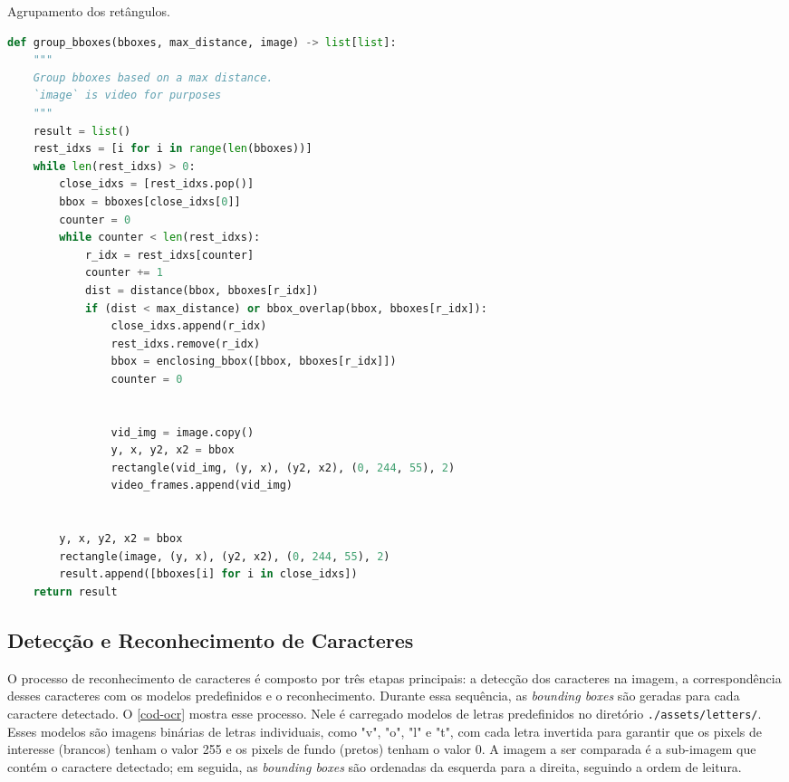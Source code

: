 \documentclass[english, 
               brazil, 
               bsc] %
               {dcomp-abntex2}
\begin{document}
\begin{codigo}[h]
  \caption{\small Agrupamento dos retângulos.}
 \label{cod-group_bboxes}
\begin{lstlisting}[language=python]
def group_bboxes(bboxes, max_distance, image) -> list[list]:
    """
    Group bboxes based on a max distance.
    `image` is video for purposes
    """
    result = list()
    rest_idxs = [i for i in range(len(bboxes))]
    while len(rest_idxs) > 0:
        close_idxs = [rest_idxs.pop()]
        bbox = bboxes[close_idxs[0]]
        counter = 0
        while counter < len(rest_idxs):
            r_idx = rest_idxs[counter]
            counter += 1
            dist = distance(bbox, bboxes[r_idx])
            if (dist < max_distance) or bbox_overlap(bbox, bboxes[r_idx]):
                close_idxs.append(r_idx)
                rest_idxs.remove(r_idx)
                bbox = enclosing_bbox([bbox, bboxes[r_idx]])
                counter = 0


                vid_img = image.copy()
                y, x, y2, x2 = bbox
                rectangle(vid_img, (y, x), (y2, x2), (0, 244, 55), 2)
                video_frames.append(vid_img)


        y, x, y2, x2 = bbox
        rectangle(image, (y, x), (y2, x2), (0, 244, 55), 2)
        result.append([bboxes[i] for i in close_idxs])
    return result
\end{lstlisting}
\end{codigo}


\subsection{Detecção e Reconhecimento de Caracteres} \label{sec-ocr}




O processo de reconhecimento de caracteres é composto por três etapas principais: a detecção dos caracteres na imagem, a correspondência desses caracteres com os modelos predefinidos e o reconhecimento. Durante essa sequência, as \textit{bounding boxes} são geradas para cada caractere detectado. O \autoref{cod-ocr} mostra esse processo. Nele é carregado modelos de letras predefinidos no diretório \texttt{./assets/letters/}. Esses modelos são imagens binárias de letras individuais, como "v", "o", "l" e "t", com cada letra invertida para garantir que os pixels de interesse (brancos) tenham o valor 255 e os pixels de fundo (pretos) tenham o valor 0. A imagem a ser comparada é a sub-imagem que contém o caractere detectado; em seguida, as \textit{bounding boxes} são ordenadas da esquerda para a direita, seguindo a ordem de leitura.
\end{document}
